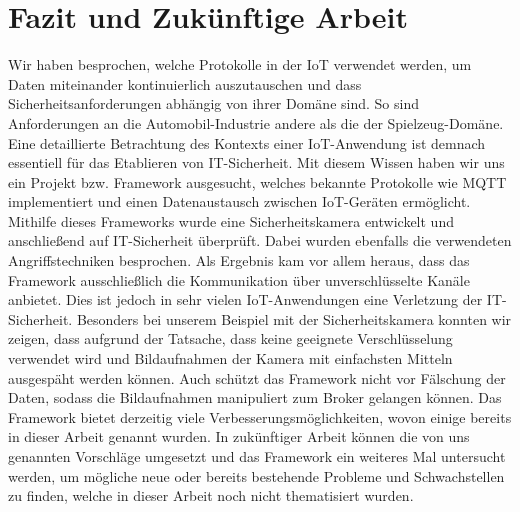 \section{Fazit und Zukünftige Arbeit}
Wir haben besprochen, welche Protokolle in der IoT verwendet werden, um Daten
miteinander kontinuierlich auszutauschen und dass Sicherheitsanforderungen
abhängig von ihrer Domäne sind. So sind Anforderungen an die Automobil-Industrie
andere als die der Spielzeug-Domäne. Eine detaillierte Betrachtung des Kontexts
einer IoT-Anwendung ist demnach essentiell für das Etablieren von IT-Sicherheit.
Mit diesem Wissen haben wir uns ein Projekt bzw. Framework ausgesucht, welches
bekannte Protokolle wie MQTT implementiert und einen Datenaustausch zwischen
IoT-Geräten ermöglicht. Mithilfe dieses Frameworks wurde eine Sicherheitskamera
entwickelt und anschließend auf IT-Sicherheit überprüft. Dabei wurden ebenfalls
die verwendeten Angriffstechniken besprochen. Als Ergebnis kam vor allem heraus,
dass das Framework ausschließlich die Kommunikation über unverschlüsselte Kanäle
anbietet. Dies ist jedoch in sehr vielen IoT-Anwendungen eine Verletzung der
IT-Sicherheit. Besonders bei unserem Beispiel mit der Sicherheitskamera konnten
wir zeigen, dass aufgrund der Tatsache, dass keine geeignete Verschlüsselung
verwendet wird und Bildaufnahmen der Kamera mit einfachsten Mitteln ausgespäht
werden können. Auch schützt das Framework nicht vor Fälschung der Daten, sodass
die Bildaufnahmen manipuliert zum Broker gelangen können. Das Framework
bietet derzeitig viele Verbesserungsmöglichkeiten, wovon einige bereits in dieser
Arbeit genannt wurden. In zukünftiger Arbeit können die von uns genannten
Vorschläge umgesetzt und das Framework ein weiteres Mal untersucht werden,
um mögliche neue oder bereits bestehende Probleme und Schwachstellen 
zu finden, welche in dieser Arbeit noch nicht thematisiert wurden.
